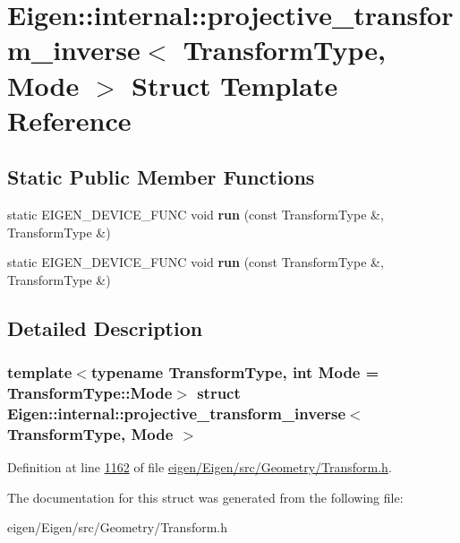 \hypertarget{struct_eigen_1_1internal_1_1projective__transform__inverse}{}\section{Eigen\+:\+:internal\+:\+:projective\+\_\+transform\+\_\+inverse$<$ Transform\+Type, Mode $>$ Struct Template Reference}
\label{struct_eigen_1_1internal_1_1projective__transform__inverse}
\subsection*{Static Public Member Functions}
\begin{DoxyCompactItemize}
\item 
\mbox{\label{struct_eigen_1_1internal_1_1projective__transform__inverse_adf4ddcf803974e309b1e280c19da56c1}} 
static E\+I\+G\+E\+N\+\_\+\+D\+E\+V\+I\+C\+E\+\_\+\+F\+U\+NC void {\bfseries run} (const Transform\+Type \&, Transform\+Type \&)
\item 
\mbox{\label{struct_eigen_1_1internal_1_1projective__transform__inverse_adf4ddcf803974e309b1e280c19da56c1}} 
static E\+I\+G\+E\+N\+\_\+\+D\+E\+V\+I\+C\+E\+\_\+\+F\+U\+NC void {\bfseries run} (const Transform\+Type \&, Transform\+Type \&)
\end{DoxyCompactItemize}


\subsection{Detailed Description}
\subsubsection*{template$<$typename Transform\+Type, int Mode = Transform\+Type\+::\+Mode$>$\newline
struct Eigen\+::internal\+::projective\+\_\+transform\+\_\+inverse$<$ Transform\+Type, Mode $>$}



Definition at line \hyperlink{eigen_2_eigen_2src_2_geometry_2_transform_8h_source_l01162}{1162} of file \hyperlink{eigen_2_eigen_2src_2_geometry_2_transform_8h_source}{eigen/\+Eigen/src/\+Geometry/\+Transform.\+h}.



The documentation for this struct was generated from the following file\+:\begin{DoxyCompactItemize}
\item 
eigen/\+Eigen/src/\+Geometry/\+Transform.\+h\end{DoxyCompactItemize}
